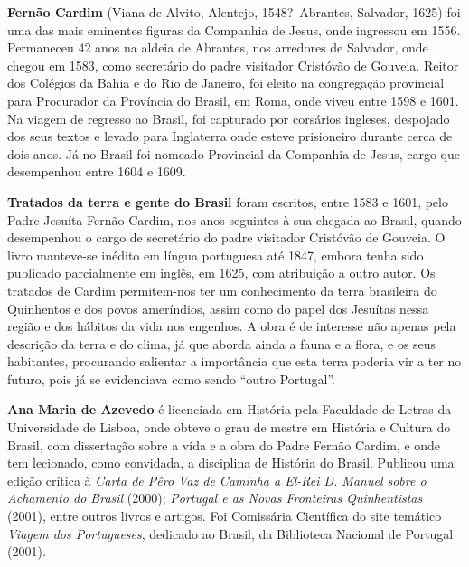 

\textbf{Fernão Cardim} (Viana de Alvito, Alentejo, 1548?--Abrantes, Salvador, 1625) foi uma das mais eminentes figuras da 
Companhia de Jesus, onde ingressou em 1556. Permaneceu 42 anos na aldeia de Abrantes, nos arredores de Salvador,
onde chegou em 1583, como secretário do padre visitador Cristóvão de Gouveia. Reitor dos Colégios da Bahia e do Rio de Janeiro, 
foi eleito na congregação provincial para Procurador da Província do Brasil, em Roma, onde viveu entre 1598 e 1601. 
Na viagem de regresso ao Brasil, foi 
capturado por corsários ingleses, despojado dos seus textos e levado para Inglaterra onde esteve prisioneiro 
durante cerca de dois anos. Já no Brasil foi nomeado Provincial da Companhia de Jesus, cargo que 
desempenhou entre 1604 e 1609. 

\textbf{Tratados da terra e gente do Brasil} foram escritos, entre 1583 e 1601, 
pelo Padre Jesuíta Fernão Cardim, nos anos seguintes à sua chegada ao Brasil, 
quando desempenhou o cargo de secretário do padre visitador Cristóvão de Gouveia. O livro manteve-se inédito 
em língua portuguesa até 1847, embora tenha sido publicado parcialmente em inglês, em 1625, com atribuição
a outro autor. 
Os tratados de Cardim permitem-nos ter um conhecimento da terra brasileira 
do Quinhentos e dos povos ameríndios, assim como do papel dos Jesuítas nessa região e dos hábitos da vida nos engenhos. 
A obra é de interesse não apenas pela descrição da terra e do clima, já que aborda ainda a fauna e a flora, e os seus 
habitantes, procurando salientar a importância que esta terra poderia vir a ter no futuro, pois já se evidenciava como 
sendo ``outro Portugal''. 

\textbf{Ana Maria de Azevedo} é licenciada em História pela Faculdade de Letras da Universidade de Lisboa, 
onde obteve o grau de mestre em História e Cultura do Brasil, com dissertação sobre a vida e a obra 
do Padre Fernão Cardim, e onde tem lecionado, como convidada, a disciplina de História do Brasil. 
Publicou uma edição crítica à \textit{Carta de Pêro Vaz de Caminha 
a El-Rei D. Manuel sobre o Achamento do Brasil} (2000); \textit{Portugal e as Novas Fronteiras Quinhentistas} 
(2001), entre outros livros e artigos. Foi Comissária Científica do site temático \textit{Viagem dos Portugueses}, 
dedicado ao Brasil, da Biblioteca Nacional de Portugal (2001).


